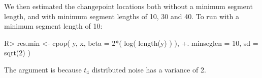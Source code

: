 \documentclass[nojss]{jss}
\begin{document}
We then estimated the changepoint locations both without a minimum segment length, and with minimum segment lengths of 10, 30 and 40. To run  with a minimum segment length of 10:
\begin{CodeChunk}
\begin{CodeInput}
R> res.min <- cpop( y, x, beta = 2*( log( length(y) ) ),
  +. minseglen = 10, sd = sqrt(2) )
\end{CodeInput}
\end{CodeChunk}
The argument  is because $t_4$ distributed noise has a variance of 2.
%
%
%
\end{document}
